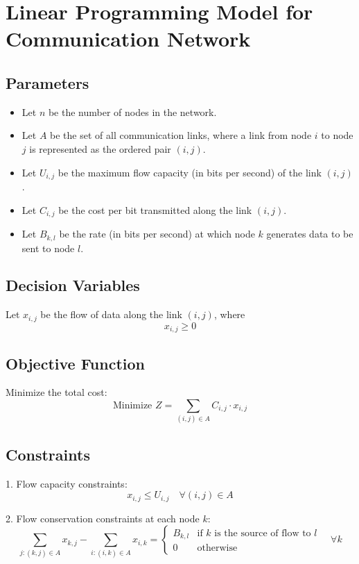 \documentclass{article}
\begin{document}
\section*{Linear Programming Model for Communication Network}

\subsection*{Parameters}
\begin{itemize}
    \item Let \( n \) be the number of nodes in the network.
    \item Let \( A \) be the set of all communication links, where a link from node \( i \) to node \( j \) is represented as the ordered pair \( (i,j) \).
    \item Let \( U_{i,j} \) be the maximum flow capacity (in bits per second) of the link \( (i,j) \).
    \item Let \( C_{i,j} \) be the cost per bit transmitted along the link \( (i,j) \).
    \item Let \( B_{k,l} \) be the rate (in bits per second) at which node \( k \) generates data to be sent to node \( l \).
\end{itemize}

\subsection*{Decision Variables}
Let \( x_{i,j} \) be the flow of data along the link \( (i,j) \), where
\[
x_{i,j} \geq 0
\]

\subsection*{Objective Function}
Minimize the total cost:
\[
\text{Minimize } Z = \sum_{(i,j) \in A} C_{i,j} \cdot x_{i,j}
\]

\subsection*{Constraints}
1. Flow capacity constraints:
\[
x_{i,j} \leq U_{i,j} \quad \forall (i,j) \in A
\]

2. Flow conservation constraints at each node \( k \):
\[
\sum_{j: (k,j) \in A} x_{k,j} - \sum_{i: (i,k) \in A} x_{i,k} = 
\begin{cases} 
B_{k,l} & \text{if } k \text{ is the source of flow to } l \\
0 & \text{otherwise}
\end{cases} \quad \forall k
\]
\end{document}
